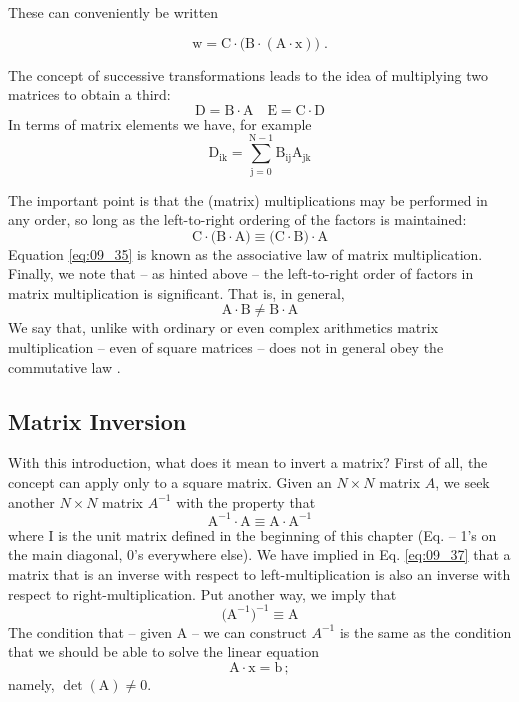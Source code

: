 These can conveniently be written

\begin{equation}
    \label{eq:09_32}
    \mathrm{w=C \cdot \Big( B \cdot (A \cdot x) \Big) \; .}%
\end{equation}

The concept of successive transformations leads to the idea of multiplying two matrices to obtain a third:
\begin{equation}
    \label{eq:09_33}
    \mathrm{D = B \cdot A \quad E = C \cdot D}
\end{equation}
In terms of matrix elements we have, for example
\begin{equation}
    \label{eq:09_34}
    \mathrm{D_{ik} = \sum_{j=0}^{N-1} B_{ij} A_{jk}}
\end{equation}

The important point is that the (matrix) multiplications may be performed in any order, so long as the left-to-right ordering of the factors is maintained:
\begin{equation}
    \label{eq:09_35}
    \mathrm{C \cdot \big( B \cdot A \big) \equiv \big( C \cdot B \big) \cdot A}
\end{equation}
Equation \ref{eq:09_35} is known as the associative law of matrix multiplication. Finally, we note that -- as hinted above -- the left-to-right order of factors in matrix multiplication is significant. That is, in general,
\begin{equation}
    \label{eq:09_36}
    \mathrm{A \cdot B \neq B \cdot A}
\end{equation}
We say that, unlike with ordinary or even complex arithmetics matrix multiplication -- even of square matrices -- does not in general obey the commutative law .

\subsection{Matrix Inversion}
With this introduction, what does it mean to invert a matrix? First of all, the concept can apply only to a square matrix. Given an
$N \times N$ matrix $A$, we seek another $N \times N$ matrix $A^{-1}$ with the property that
\begin{equation}
    \label{eq:09_37}
    \mathrm{A^{-1} \cdot A \equiv A \cdot A^{-1}}
\end{equation} 
where I is the unit matrix defined in the beginning of this chapter (Eq. -- 1's on the main diagonal, 0's everywhere else). We have implied in Eq. \ref{eq:09_37} that a matrix that is an inverse with respect to left-multiplication is also an inverse with respect to right-multiplication. Put another way, we imply that
\begin{equation}
    \label{eq:09_38}
    \mathrm{\Big(A^{-1} \Big)^{-1} \equiv A}
\end{equation} 
The condition that -- given A -- we can construct $A^{-1}$ is the same as the condition that we should be able to solve the linear equation
\begin{equation*}
    \mathrm{A \cdot x = b \,;}
\end{equation*} 
 namely, $\det(\mathrm{A}) \neq 0$.

